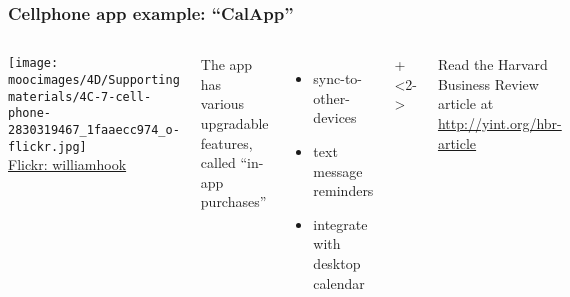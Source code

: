 \documentclass[handout,11pt,aspectratio=169,mathserif]{beamer}
\begin{document}
\begin{frame}\frametitle{Cellphone app example: ``CalApp''}	
	\begin{columns}[T]
			\texttt{[image: \\moocimages/4D/Supporting materials/4C-7-cell-phone-2830319467\_1faaecc974\_o-flickr.jpg]}
			\\
			\tiny{\href{https://secure.flickr.com/photos/williamhook/2830319467/}{Flickr: williamhook}}
			
		
			The app has various upgradable features, called ``in-app purchases''
			
			\begin{itemize}
				\item	sync-to-other-devices
				\item	text message reminders
				\item	integrate with desktop calendar
			\end{itemize}
			
			\vspace{1cm}
			
			
		\onslide+<2->{	
		}
		
		\vspace{0.5cm}
		{\scriptsize Read the Harvard Business Review article at \href{http://yint.org/hbr-article}{http://yint.org/hbr-article}}
		 
	\end{columns}	
\end{frame}
\end{document}
